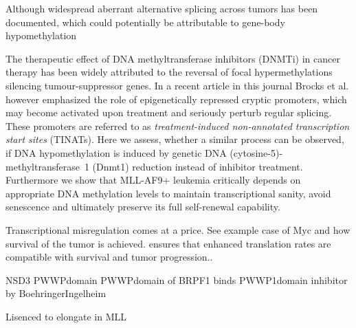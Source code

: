 Although widespread aberrant alternative splicing across tumors has been documented\cite{Kahles2018}, which could potentially be attributable to gene-body hypomethylation\cite{Mendizabal2017}


The therapeutic effect of DNA methyltransferase inhibitors (DNMTi) in cancer therapy has been widely attributed to the reversal of focal hypermethylations silencing tumour-suppressor genes\cite{Cai2017}. In a recent article in this journal Brocks et al.\cite{Brocks2017} however emphasized the role of epigenetically repressed cryptic promoters, which may become activated upon treatment and seriously perturb regular splicing. These promoters are referred to as \emph{treatment-induced non-annotated transcription start sites} (TINATs). Here we assess, whether a similar process can be observed, if DNA hypomethylation is induced by genetic DNA (cytosine-5)-methyltransferase~1 (Dnmt1) reduction instead of inhibitor treatment. Furthermore we show that MLL-AF9+ leukemia critically depends on appropriate DNA methylation levels to maintain transcriptional sanity, avoid senescence and ultimately preserve its full self-renewal capability. 



Transcriptional misregulation comes at a price. See example case of Myc and how survival of the tumor is achieved. ensures that enhanced translation rates are compatible with survival and tumor progression.\cite{Tameire2019}.

NSD3 \cite{Taketani2009,Vougiouklakis2015}
PWWPdomain\cite{Qin2014}  PWWPdomain of BRPF1 binds \histhirtysixthree \cite{Vezzoli2010}
PWWP1domain inhibitor by BoehringerIngelheim\cite{Boettcher2019}

Lisenced to elongate in MLL\cite{Mohan2010}